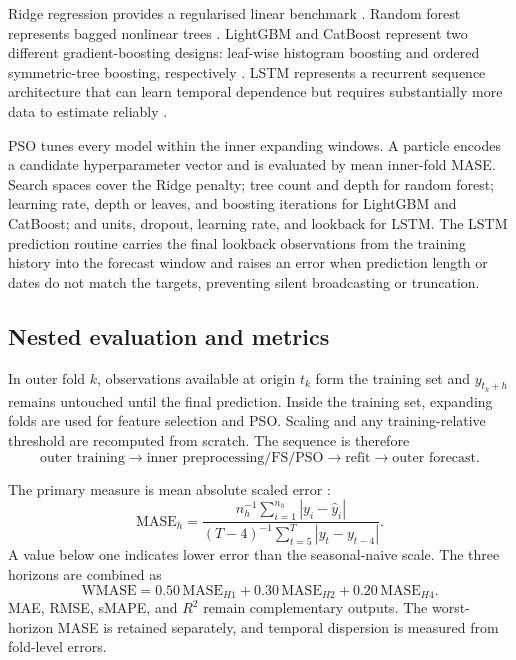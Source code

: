 \documentclass[preprint,12pt]{elsarticle}
\begin{document}
Ridge regression provides a regularised linear benchmark \citep{hoerl1970}. Random forest represents bagged nonlinear trees \citep{breiman2001}. LightGBM and CatBoost represent two different gradient-boosting designs: leaf-wise histogram boosting and ordered symmetric-tree boosting, respectively \citep{ke2017,prokhorenkova2018}. LSTM represents a recurrent sequence architecture that can learn temporal dependence but requires substantially more data to estimate reliably \citep{hochreiter1997}.

PSO tunes every model within the inner expanding windows. A particle encodes a candidate hyperparameter vector and is evaluated by mean inner-fold MASE. Search spaces cover the Ridge penalty; tree count and depth for random forest; learning rate, depth or leaves, and boosting iterations for LightGBM and CatBoost; and units, dropout, learning rate, and lookback for LSTM. The LSTM prediction routine carries the final lookback observations from the training history into the forecast window and raises an error when prediction length or dates do not match the targets, preventing silent broadcasting or truncation.

\subsection{Nested evaluation and metrics}

In outer fold $k$, observations available at origin $t_k$ form the training set and $y_{t_k+h}$ remains untouched until the final prediction. Inside the training set, expanding folds are used for feature selection and PSO. Scaling and any training-relative threshold are recomputed from scratch. The sequence is therefore
\begin{equation*}
\text{outer training}\rightarrow\text{inner preprocessing/FS/PSO}\rightarrow
\text{refit}\rightarrow\text{outer forecast}.
\end{equation*}

The primary measure is mean absolute scaled error \citep{hyndmankoehler2006}:
\begin{equation}
 \mathrm{MASE}_h=
 \frac{n_h^{-1}\sum_{i=1}^{n_h}|y_i-\widehat{y}_i|}
 {(T-4)^{-1}\sum_{t=5}^{T}|y_t-y_{t-4}|}.
 \label{eq:mase}
\end{equation}
A value below one indicates lower error than the seasonal-naive scale. The three horizons are combined as
\begin{equation}
 \mathrm{WMASE}=0.50\,\mathrm{MASE}_{H1}+0.30\,\mathrm{MASE}_{H2}+0.20\,\mathrm{MASE}_{H4}.
 \label{eq:wmase}
\end{equation}
MAE, RMSE, sMAPE, and $R^2$ remain complementary outputs. The worst-horizon MASE is retained separately, and temporal dispersion is measured from fold-level errors.
\end{document}
